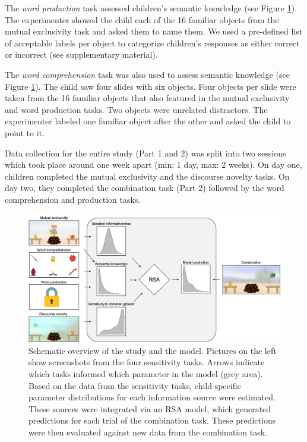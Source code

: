 \documentclass[
  man,floatsintext]{apa6}
\begin{document}
The \emph{word production} task assessed children's semantic knowledge (see Figure \ref{fig:fig1}). The experimenter showed the child each of the 16 familiar objects from the mutual exclusivity task and asked them to name them. We used a pre-defined list of acceptable labels per object to categorize children's responses as either correct or incorrect (see supplementary material).

The \emph{word comprehension} task was also used to assess semantic knowledge (see Figure \ref{fig:fig1}). The child saw four slides with six objects. Four objects per slide were taken from the 16 familiar objects that also featured in the mutual exclusivity and word production tasks. Two objects were unrelated distractors. The experimenter labeled one familiar object after the other and asked the child to point to it.

Data collection for the entire study (Part 1 and 2) was split into two sessions which took place around one week apart (min: 1 day, max: 2 weeks). On day one, children completed the mutual exclusivity and the discourse novelty tasks. On day two, they completed the combination task (Part 2) followed by the word comprehension and production tasks.

\begin{figure}
\includegraphics[width=1\linewidth]{./figures/fig1} \caption{Schematic overview of the study and the model. Pictures on the left show screenshots from the four sensitivity tasks. Arrows indicate which tasks informed which parameter in the model (grey area). Based on the data from the sensitivity tasks, child-specific parameter distributions for each information source were estimated. These sources were integrated via an RSA model, which generated predictions for each trial of the combination task. These predictions were then evaluated against new data from the combination task.}\label{fig:fig1}
\end{figure}
\end{document}
